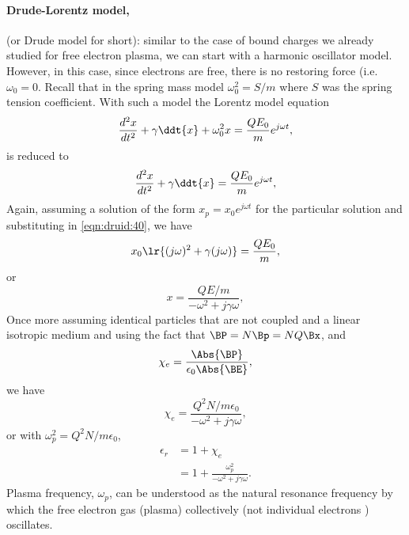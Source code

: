 \paragraph{Drude-Lorentz model,} (or Drude model for short): similar to the case of bound charges we already studied for free electron plasma, we can start with a harmonic oscillator model.  However, in this case, since electrons are free, there is no restoring force (i.e. \(\omega_0 = 0 \).  Recall that in the spring mass model \( \omega_0^2 = S/m \) where \( S \) was the spring tension coefficient.
%
With such a model the Lorentz model equation
%
\begin{equation}\label{eqn:druid:20}
\frac{d^2 x}{dt^2} + \gamma \ddt{x} + \omega_0^2 x = \frac{Q E_0}{m} e^{j \omega t},
\end{equation}
%
is reduced to
%
\begin{equation}\label{eqn:druid:40}
\frac{d^2 x}{dt^2} + \gamma \ddt{x} = \frac{Q E_0}{m} e^{j \omega t},
\end{equation}
%
Again, assuming a solution of the form \( x_p = x_0 e^{j \omega t} \) for the particular solution and substituting in \cref{eqn:druid:40}, we have
%
\begin{equation}\label{eqn:druid:80}
x_0 \lr{ (j\omega)^2 + \gamma (j \omega)} = \frac{Q E_0}{m},
\end{equation}
%
or
\begin{equation}\label{eqn:druid:60}
x
=
\frac{Q E/m}{-\omega^2 + j \gamma \omega },
\end{equation}
%
Once more assuming identical particles that are not coupled and a linear isotropic medium and using the fact that \( \BP = N \Bp = N Q \Bx \), and
%
\begin{equation}\label{eqn:druid:100}
\chi_e = \frac{\Abs{\BP}}{\epsilon_0 \Abs{\BE} },
\end{equation}
%
we have
%
\begin{equation}\label{eqn:druid:120}
\chi_e
=
\frac{Q^2 N/m \epsilon_0}{-\omega^2 + j \gamma \omega },
\end{equation}
%
or with \( \omega_p^2 = Q^2 N/m\epsilon_0\),
%
\begin{equation}\label{eqn:druid:140}
\begin{aligned}
\epsilon_r
&= 1 + \chi_e
\\ &=
1+
\frac{\omega_p^2}{-\omega^2 + j \gamma \omega }.
\end{aligned}
\end{equation}
%
Plasma frequency, \( \omega_p \), can be understood as the natural resonance frequency by which the free electron gas (plasma) collectively (not individual electrons ) oscillates.
